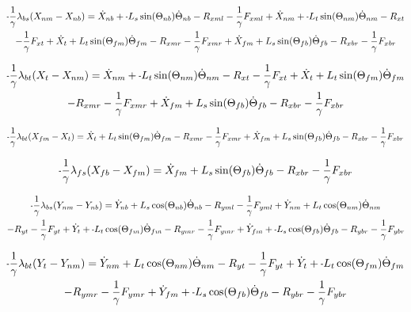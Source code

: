 \documentclass[11pt, landscape]{article}
\newcommand{\mn}{\scalebox{0.7}[1.0]{-}}
\begin{document}
\begin{multline}
\mn\frac{1}{\gamma}\lambda_{bs}(X_{nm} - X_{nb}) =
\dot{X}_{nb} + \mn L_{s}\sin(\Theta_{nb})\dot{\Theta}_{nb} - R_{xml} - \frac{1}{\gamma}F_{xml} + \dot{X}_{nm} + \mn L_{t}\sin(\Theta_{nm})\dot{\Theta}_{nm} - R_{xt } \\
- \frac{1}{\gamma}F_{xt } + \dot{X}_{t } + L_{t}\sin(\Theta_{fm})\dot{\Theta}_{fm} - R_{xmr}
-\frac{1}{\gamma}F_{xmr} + \dot{X}_{fm} + L_{s}\sin(\Theta_{fb})\dot{\Theta}_{fb} - R_{xbr} - \frac{1}{\gamma}F_{xbr}
\label{eq:Ax}
\end{multline}%

\begin{multline}
\mn\frac{1}{\gamma}\lambda_{bt}(X_{t } - X_{nm}) =
\dot{X}_{nm} + \mn L_{t}\sin(\Theta_{nm})\dot{\Theta}_{nm} - R_{xt } - \frac{1}{\gamma}F_{xt } + \dot{X}_{t } + L_{t}\sin(\Theta_{fm})\dot{\Theta}_{fm} \\
- R_{xmr} - \frac{1}{\gamma}F_{xmr} + \dot{X}_{fm} + L_{s}\sin(\Theta_{fb})\dot{\Theta}_{fb} - R_{xbr} - \frac{1}{\gamma}F_{xbr}
\label{eq:Bx}
\end{multline}%

\begin{equation}
\mn\frac{1}{\gamma}\lambda_{bt}(X_{fm} - X_{t }) =
\dot{X}_{t } + L_{t}\sin(\Theta_{fm})\dot{\Theta}_{fm} - R_{xmr} - \frac{1}{\gamma}F_{xmr}
+ \dot{X}_{fm} + L_{s}\sin(\Theta_{fb})\dot{\Theta}_{fb} - R_{xbr} - \frac{1}{\gamma}F_{xbr}
\label{eq:Cx}
\end{equation}%

\begin{equation}
\mn\frac{1}{\gamma}\lambda_{fs}(X_{fb} - X_{fm}) = 
\dot{X}_{fm} + L_{s}\sin(\Theta_{fb})\dot{\Theta}_{fb} - R_{xbr} - \frac{1}{\gamma}F_{xbr}
\label{eq:Dx}
\end{equation}%


\begin{multline}
\mn\frac{1}{\gamma}\lambda_{bs}(Y_{nm} - Y_{nb}) =
\dot{Y}_{nb} + L_{s}\cos(\Theta_{nb})\dot{\Theta}_{nb} - R_{yml} - \frac{1}{\gamma}F_{yml} + \dot{Y}_{nm} + L_{t}\cos(\Theta_{nm})\dot{\Theta}_{nm} \\
- R_{yt} - \frac{1}{\gamma}F_{yt } + \dot{Y}_{t } + \mn L_{t}\cos(\Theta_{fm})\dot{\Theta}_{fm} - R_{ymr} - \frac{1}{\gamma}F_{ymr} + \dot{Y}_{fm}
+ \mn L_{s}\cos(\Theta_{fb})\dot{\Theta}_{fb} - R_{ybr} - \frac{1}{\gamma}F_{ybr}
\label{eq:Ay}
\end{multline}%

\begin{multline}
\mn\frac{1}{\gamma}\lambda_{bt}(Y_{t } - Y_{nm}) =
\dot{Y}_{nm} + L_{t}\cos(\Theta_{nm})\dot{\Theta}_{nm} - R_{yt} - \frac{1}{\gamma}F_{yt } + \dot{Y}_{t } + \mn L_{t}\cos(\Theta_{fm})\dot{\Theta}_{fm} \\
- R_{ymr} - \frac{1}{\gamma}F_{ymr} + \dot{Y}_{fm} + \mn L_{s}\cos(\Theta_{fb})\dot{\Theta}_{fb} - R_{ybr} - \frac{1}{\gamma}F_{ybr}
\label{eq:By}
\end{multline}%
\end{document}
